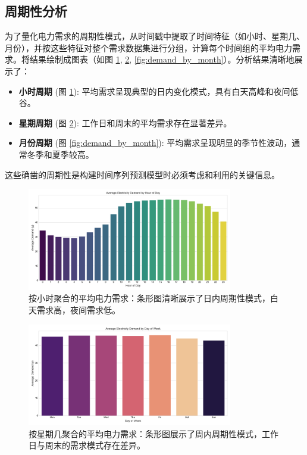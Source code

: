 \documentclass{article} %
\begin{document}
\subsection{周期性分析}
\label{sec:periodicity_analysis}

为了量化电力需求的周期性模式，从时间戳中提取了时间特征（如小时、星期几、月份），并按这些特征对整个需求数据集进行分组，计算每个时间组的平均电力需求。将结果绘制成图表（如图 \ref{fig:demand_by_hour}, \ref{fig:demand_by_dayofweek}, \ref{fig:demand_by_month}）。分析结果清晰地展示了：
\begin{itemize}
    \item \textbf{小时周期} (图 \ref{fig:demand_by_hour}): 平均需求呈现典型的日内变化模式，具有白天高峰和夜间低谷。
    \item \textbf{星期周期} (图 \ref{fig:demand_by_dayofweek}): 工作日和周末的平均需求存在显著差异。
    \item \textbf{月份周期} (图 \ref{fig:demand_by_month}): 平均需求呈现明显的季节性波动，通常冬季和夏季较高。
\end{itemize}
这些确凿的周期性是构建时间序列预测模型时必须考虑和利用的关键信息。

\begin{figure}[H]
    \centering
    \includegraphics[width=0.8\textwidth]{../plots/avg_demand_by_hour_spark.png}
    \caption{按小时聚合的平均电力需求：条形图清晰展示了日内周期性模式，白天需求高，夜间需求低。} %
    \label{fig:demand_by_hour}
\end{figure}

\begin{figure}[H]
    \centering
    \includegraphics[width=0.8\textwidth]{../plots/avg_demand_by_dayofweek_spark.png}
    \caption{按星期几聚合的平均电力需求：条形图展示了周内周期性模式，工作日与周末的需求模式存在差异。} %
    \label{fig:demand_by_dayofweek}
\end{figure}
\end{document}
